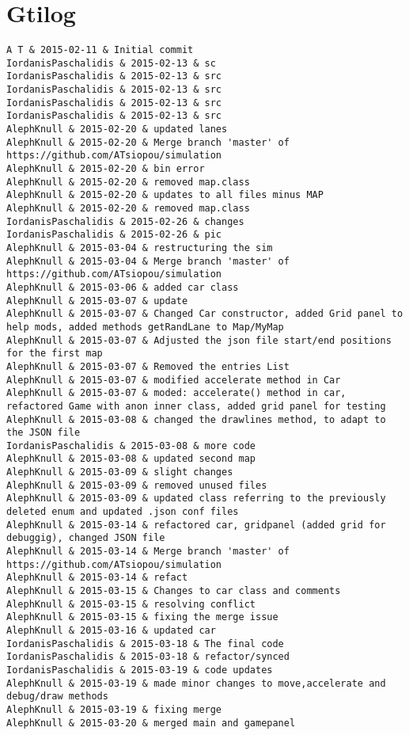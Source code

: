 \section{Gtilog}
\begin{lstlisting}
A T & 2015-02-11 & Initial commit
IordanisPaschalidis & 2015-02-13 & sc
IordanisPaschalidis & 2015-02-13 & src
IordanisPaschalidis & 2015-02-13 & src
IordanisPaschalidis & 2015-02-13 & src
IordanisPaschalidis & 2015-02-13 & src
AlephKnull & 2015-02-20 & updated lanes
AlephKnull & 2015-02-20 & Merge branch 'master' of https://github.com/ATsiopou/simulation
AlephKnull & 2015-02-20 & bin error
AlephKnull & 2015-02-20 & removed map.class
AlephKnull & 2015-02-20 & updates to all files minus MAP
AlephKnull & 2015-02-20 & removed map.class
IordanisPaschalidis & 2015-02-26 & changes
IordanisPaschalidis & 2015-02-26 & pic
AlephKnull & 2015-03-04 & restructuring the sim
AlephKnull & 2015-03-04 & Merge branch 'master' of https://github.com/ATsiopou/simulation
AlephKnull & 2015-03-06 & added car class
AlephKnull & 2015-03-07 & update
AlephKnull & 2015-03-07 & Changed Car constructor, added Grid panel to help mods, added methods getRandLane to Map/MyMap
AlephKnull & 2015-03-07 & Adjusted the json file start/end positions for the first map
AlephKnull & 2015-03-07 & Removed the entries List
AlephKnull & 2015-03-07 & modified accelerate method in Car
AlephKnull & 2015-03-07 & moded: accelerate() method in car, refactored Game with anon inner class, added grid panel for testing
AlephKnull & 2015-03-08 & changed the drawlines method, to adapt to the JSON file
IordanisPaschalidis & 2015-03-08 & more code
AlephKnull & 2015-03-08 & updated second map
AlephKnull & 2015-03-09 & slight changes
AlephKnull & 2015-03-09 & removed unused files
AlephKnull & 2015-03-09 & updated class referring to the previously deleted enum and updated .json conf files
AlephKnull & 2015-03-14 & refactored car, gridpanel (added grid for debuggig), changed JSON file
AlephKnull & 2015-03-14 & Merge branch 'master' of https://github.com/ATsiopou/simulation
AlephKnull & 2015-03-14 & refact
AlephKnull & 2015-03-15 & Changes to car class and comments
AlephKnull & 2015-03-15 & resolving conflict
AlephKnull & 2015-03-15 & fixing the merge issue
AlephKnull & 2015-03-16 & updated car
IordanisPaschalidis & 2015-03-18 & The final code
IordanisPaschalidis & 2015-03-18 & refactor/synced
IordanisPaschalidis & 2015-03-19 & code updates
AlephKnull & 2015-03-19 & made minor changes to move,accelerate and debug/draw methods
AlephKnull & 2015-03-19 & fixing merge
AlephKnull & 2015-03-20 & merged main and gamepanel

\end{lstlisting}
